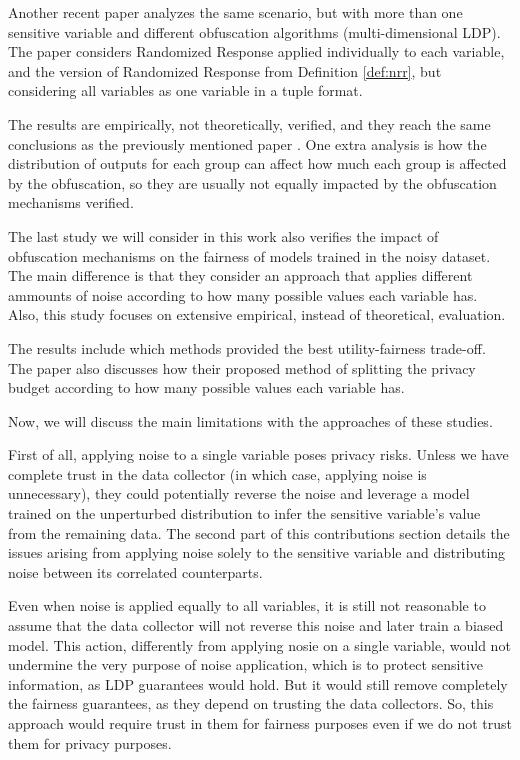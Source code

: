 \documentclass[conference]{IEEEtran}
\begin{document}
Another recent paper \cite{makhlouf2024impact} analyzes the same scenario, but with more than one sensitive variable and different obfuscation algorithms (multi-dimensional LDP). The paper considers Randomized Response applied individually to each variable, and the version of Randomized Response from Definition \ref{def:nrr}, but considering all variables as one variable in a tuple format. 

The results are empirically, not theoretically, verified, and they reach the same conclusions as the previously mentioned paper \cite{makhlouf2024systematicformalstudyimpact}. One extra analysis is how the distribution of outputs for each group can affect how much each group is affected by the obfuscation, so they are usually not equally impacted by the obfuscation mechanisms verified.

The last study we will consider in this work \cite{arcolezi2023local} also verifies the impact of obfuscation mechanisms on the fairness of models trained in the noisy dataset. The main difference is that they consider an approach that applies different ammounts of noise according to how many possible values each variable has. Also, this study focuses on extensive empirical, instead of theoretical, evaluation.

The results include which methods provided the best utility-fairness trade-off. The paper also discusses how their proposed method of splitting the privacy budget according to how many possible values each variable has.

Now, we will discuss the main limitations with the approaches of these studies.

First of all, applying noise to a single variable poses privacy risks. Unless we have complete trust in the data collector (in which case, applying noise is unnecessary), they could potentially reverse the noise and leverage a model trained on the unperturbed distribution to infer the sensitive variable's value from the remaining data. The second part of this contributions section details the issues arising from applying noise solely to the sensitive variable and distributing noise between its correlated counterparts.

Even when noise is applied equally to all variables, it is still not reasonable to assume that the data collector will not reverse this noise and later train a biased model. This action, differently from applying nosie on a single variable, would not undermine the very purpose of noise application, which is to protect sensitive information, as LDP guarantees would hold. But it would still remove completely the fairness guarantees, as they depend on trusting the data collectors. So, this approach would require trust in them for fairness purposes even if we do not trust them for privacy purposes.
\end{document}
